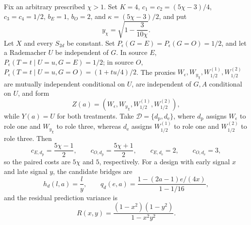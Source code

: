 Fix an arbitrary prescribed \(\chi>1\). Set \(K=4\), \(c_1=c_2=(5\chi-3)/4\), \(c_3=c_4=1/2\), \(b_E=1\), \(b_O=2\), and \(\kappa=(5\chi-3)/2\), and put
\[
 y_{\chi}=\sqrt{1-\frac{3}{10\chi}}.
\]
Let \(X\) and every \(S_{2d}\) be constant. Set \(P_{\epsilon}(G=E)=P_{\epsilon}(G=O)=1/2\), and let a Rademacher \(U\) be independent of \(G\). In source \(E\), \(P_{\epsilon}(T=t\mid U=u,G=E)=1/2\); in source \(O\), \(P_{\epsilon}(T=t\mid U=u,G=O)=(1+tu/4)/2\). The proxies \(W_{\epsilon},W_{y_{\chi}},W_{1/2}^{(1)},W_{1/2}^{(2)}\) are mutually independent conditional on \(U\), are independent of \(G,A\) conditional on \(U\), and form
\[
 Z(a)=(W_{\epsilon},W_{y_{\chi}},W_{1/2}^{(1)},W_{1/2}^{(2)}),
\]
while \(Y(a)=U\) for both treatments. Take \(\mathcal D=\{d_{\mathrm p},d_{\mathrm e}\}\), where \(d_{\mathrm p}\) assigns \(W_{\epsilon}\) to role one and \(W_{y_{\chi}}\) to role three, whereas \(d_{\mathrm e}\) assigns \(W_{1/2}^{(1)}\) to role one and \(W_{1/2}^{(2)}\) to role three. Then
\[
 c_{E,d_{\mathrm p}}=\frac{5\chi-1}{2},\qquad
 c_{O,d_{\mathrm p}}=\frac{5\chi+1}{2},\qquad
 c_{E,d_{\mathrm e}}=2,\qquad c_{O,d_{\mathrm e}}=3,
\]
so the paired costs are \(5\chi\) and \(5\), respectively. For a design with early signal \(x\) and late signal \(y\), the candidate bridges are
\[
 h_d(l,a)=\frac{l}{y},
 \qquad
 q_d(e,a)=\frac{1-(2a-1)e/(4x)}{1-1/16},
\]
and the residual prediction variance is
\[
 R(x,y)=\frac{(1-x^2)(1-y^2)}{1-x^2y^2}.
\]